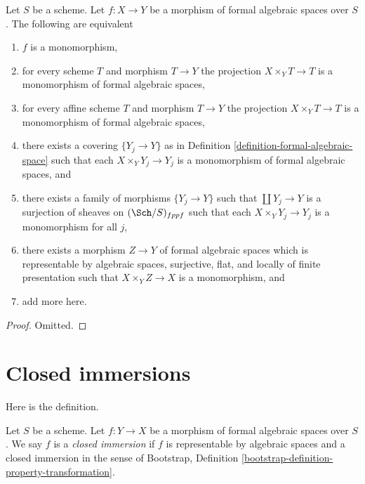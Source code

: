 \begin{lemma}
\label{lemma-characterize-monomorphisms}
Let $S$ be a scheme. Let $f : X \to Y$ be a morphism of formal algebraic
spaces over $S$. The following are equivalent
\begin{enumerate}
\item $f$ is a monomorphism,
\item for every scheme $T$ and morphism $T \to Y$
the projection $X \times_Y T \to T$ is a monomorphism
of formal algebraic spaces,
\item for every affine scheme $T$ and morphism $T \to Y$
the projection $X \times_Y T \to T$ is a monomorphism of formal
algebraic spaces,
\item there exists a covering $\{Y_j \to Y\}$ as in
Definition \ref{definition-formal-algebraic-space}
such that each $X \times_Y Y_j \to Y_j$ is a monomorphism of
formal algebraic spaces, and
\item there exists a family of morphisms $\{Y_j \to Y\}$ such
that $\coprod Y_j \to Y$ is a surjection of sheaves on
$(\Sch/S)_{fppf}$ such that each $X \times_Y Y_j \to Y_j$ is a
monomorphism for all $j$,
\item there exists a morphism $Z \to Y$ of formal algebraic spaces
which is representable by algebraic spaces, surjective, flat, and locally
of finite presentation such that $X \times_Y Z \to X$ is a monomorphism, and
\item add more here.
\end{enumerate}
\end{lemma}

\begin{proof}
Omitted.
\end{proof}





\section{Closed immersions}
\label{section-closed-immersions}

\noindent
Here is the definition.

\begin{definition}
\label{definition-closed-immersion}
Let $S$ be a scheme. Let $f : Y \to X$ be a morphism of formal algebraic
spaces over $S$. We say $f$ is a {\it closed immersion}
if $f$ is representable by algebraic spaces and a closed immersion
in the sense of
Bootstrap, Definition \ref{bootstrap-definition-property-transformation}.
\end{definition}

